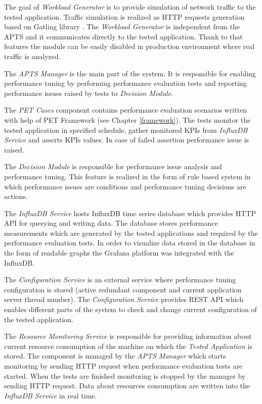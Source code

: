 \documentclass[10pt,a4paper]{article}
\begin{document}
The goal of \textit{Workload Generator} is to provide simulation of network traffic to the tested application. Traffic simulation is realized as HTTP requests generation based on Gatling library \cite{gatling}. The \textit{Workload Generator} is independent from the APTS and it communicates directly to the tested application. Thank to that features the module can be easily disabled in production environment where real traffic is analyzed.  

The \textit{APTS Manager} is the main part of the system. It is responsible for enabling performance tuning by performing performance evaluation tests and reporting performance issues raised by tests to \textit{Decision Module}. 

The \textit{PET Cases} component contains performance evaluation scenarios written with help of PET Framework (see Chapter \ref{framework}). The tests monitor the tested application in specified schedule, gather monitored KPIs from \textit{InfluxDB Service} and asserts KPIs values. In case of failed assertion performance issue is raised.

The \textit{Decision Module} is responsible for performance issue analysis and performance tuning. This feature is realized in the form of rule based system in which performance issues are conditions and performance tuning decisions are actions.   

The \textit{InfluxDB Service} hosts InfluxDB \cite{influxdb} time series database which provides HTTP API for querying and writing data. The database stores performance measurements which are generated by the tested applications and required by the performance evaluation tests. In order to visualize data stored in the database in the form of readable graphs the Grafana \cite{grafana} platform was integrated with the InfluxDB. 

The \textit{Configuration Service} is an external service where performance tuning configuration is stored (active redundant component and current application server thread number). The \textit{Configuration Service} provides REST API which enables different parts of the system to check and change current configuration of the tested application.

The \textit{Resource Monitoring Service} is responsible for providing information about current resource consumption of the machine on which the \textit{Tested Application} is stored. The component is managed by the \textit{APTS Manager} which starts monitoring by sending HTTP request when performance evaluation tests are started. When the tests are finished monitoring is stopped by the manager by sending HTTP request. Data about resources consumption are written into the \textit{InfluxDB Service} in real time. 
\end{document}
